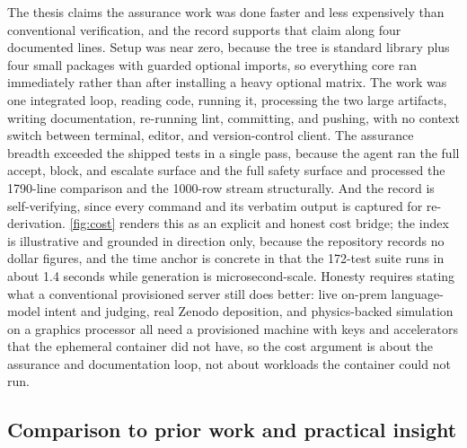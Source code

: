The thesis claims the assurance work was done faster and less expensively than
conventional verification, and the record supports that claim along four
documented lines. Setup was near zero, because the tree is standard library plus
four small packages with guarded optional imports, so everything core ran
immediately rather than after installing a heavy optional matrix. The work was
one integrated loop, reading code, running it, processing the two large
artifacts, writing documentation, re-running lint, committing, and pushing, with
no context switch between terminal, editor, and version-control client. The
assurance breadth exceeded the shipped tests in a single pass, because the agent
ran the full accept, block, and escalate surface and the full safety surface and
processed the 1790-line comparison and the 1000-row stream structurally. And the
record is self-verifying, since every command and its verbatim output is captured
for re-derivation. \autoref{fig:cost} renders this as an explicit and honest cost
bridge; the index is illustrative and grounded in direction only, because the
repository records no dollar figures, and the time anchor is concrete in that the
172-test suite runs in about 1.4 seconds while generation is microsecond-scale.
Honesty requires stating what a conventional provisioned server still does
better: live on-prem language-model intent and judging, real Zenodo deposition,
and physics-backed simulation on a graphics processor all need a provisioned
machine with keys and accelerators that the ephemeral container did not have, so
the cost argument is about the assurance and documentation loop, not about
workloads the container could not run.

\subsection{Comparison to prior work and practical insight}

